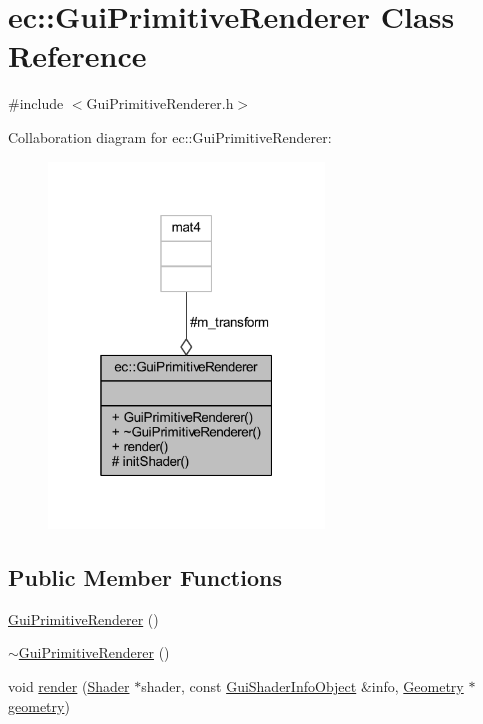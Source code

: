 \hypertarget{classec_1_1_gui_primitive_renderer}{}\section{ec\+:\+:Gui\+Primitive\+Renderer Class Reference}
\label{classec_1_1_gui_primitive_renderer}


{\ttfamily \#include $<$Gui\+Primitive\+Renderer.\+h$>$}



Collaboration diagram for ec\+:\+:Gui\+Primitive\+Renderer\+:\nopagebreak
\begin{figure}[H]
\begin{center}
\leavevmode
\includegraphics[width=208pt]{classec_1_1_gui_primitive_renderer__coll__graph}
\end{center}
\end{figure}
\subsection*{Public Member Functions}
\begin{DoxyCompactItemize}
\item 
\mbox{\hyperlink{classec_1_1_gui_primitive_renderer_ad5dec69952ed7ee82769fecb40a83fe8}{Gui\+Primitive\+Renderer}} ()
\item 
\mbox{\hyperlink{classec_1_1_gui_primitive_renderer_abd5bd68a4ba482a2fa7ef9650c289ca8}{$\sim$\+Gui\+Primitive\+Renderer}} ()
\item 
void \mbox{\hyperlink{classec_1_1_gui_primitive_renderer_abee889f2ebf94c6ae71cc7b39098a002}{render}} (\mbox{\hyperlink{classec_1_1_shader}{Shader}} $\ast$shader, const \mbox{\hyperlink{structec_1_1_gui_shader_info_object}{Gui\+Shader\+Info\+Object}} \&info, \mbox{\hyperlink{classec_1_1_geometry}{Geometry}} $\ast$\mbox{\hyperlink{_resource_type_8h_af12fe3e5d8da3d7bd4c76e44cca2319c}{geometry}})
\end{DoxyCompactItemize}

